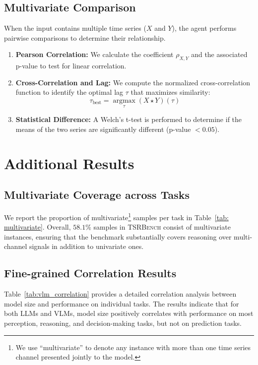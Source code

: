 \documentclass{article}
\theoremstyle{plain}
\theoremstyle{definition}
\theoremstyle{remark}
\newcommand\ours{\textsc{TSRBench}\xspace}
\theoremstyle{plain}
\begin{document}
\subsection{Multivariate Comparison}
When the input contains multiple time series ($X$ and $Y$), the agent performs pairwise comparisons to determine their relationship.
\begin{enumerate}
    \item \textbf{Pearson Correlation:} We calculate the coefficient $\rho_{X,Y}$ and the associated p-value to test for linear correlation.
    \item \textbf{Cross-Correlation and Lag:} We compute the normalized cross-correlation function to identify the optimal lag $\tau$ that maximizes similarity:
    \begin{equation}
        \tau_{\text{best}} = \operatorname*{argmax}_{\tau} (X \star Y)(\tau)
    \end{equation}
    \item \textbf{Statistical Difference:} A Welch's t-test is performed to determine if the means of the two series are significantly different (p-value $< 0.05$).
\end{enumerate}

\section{Additional Results}

\subsection{Multivariate Coverage across Tasks}
We report the proportion of multivariate\footnote{We use ``multivariate'' to denote any instance with more than one time series channel presented jointly to the model.} samples per task in Table~\ref{tab: multivariate}. Overall, $58.1\%$ samples in \ours consist of multivariate instances, ensuring that the benchmark substantially covers reasoning over multi-channel signals in addition to univariate ones.
\subsection{Fine-grained Correlation Results}
\label{sec: fine-grained correlation}
Table~\ref{tab:vlm_correlation} provides a detailed correlation analysis between model size and performance on individual tasks. The results indicate that for both LLMs and VLMs, model size positively correlates with performance on most perception, reasoning, and decision-making tasks, but not on prediction tasks.
\end{document}

